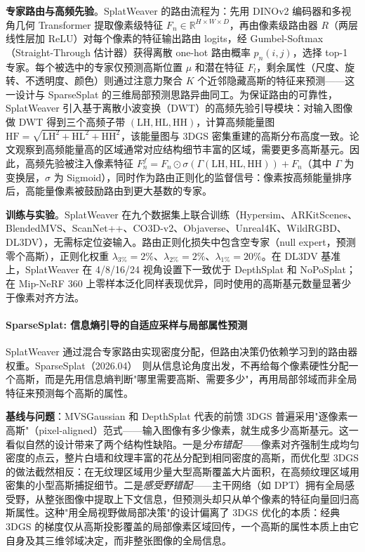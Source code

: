\textbf{专家路由与高频先验}。SplatWeaver 的路由流程为：先用 DINOv2 编码器和多视角几何 Transformer 提取像素级特征 $F_n \in \mathbb{R}^{H \times W \times D}$，再由像素级路由器 $R$（两层线性层加 ReLU）对每个像素的特征输出路由 logits，经 Gumbel-Softmax（Straight-Through 估计器）获得离散 one-hot 路由概率 $p_n(i,j)$，选择 top-1 专家。每个被选中的专家仅预测高斯位置 $\mu$ 和潜在特征 $F_l$，剩余属性（尺度、旋转、不透明度、颜色）则通过注意力聚合 $K$ 个近邻隐藏高斯的特征来预测——这一设计与 SparseSplat 的三维局部预测思路异曲同工。为保证路由的可靠性，SplatWeaver 引入基于离散小波变换（DWT）的高频先验引导模块：对输入图像做 DWT 得到三个高频子带 $(\text{LH}, \text{HL}, \text{HH})$，计算高频能量图 $\text{HF} = \sqrt{\text{LH}^2 + \text{HL}^2 + \text{HH}^2}$，该能量图与 3DGS 密集重建的高斯分布高度一致。论文观察到高频能量高的区域通常对应结构细节丰富的区域，需要更多高斯基元。因此，高频先验被注入像素特征 $F_n^f = F_n \odot \sigma(\Gamma(\text{LH}, \text{HL}, \text{HH})) + F_n$（其中 $\Gamma$ 为变换层，$\sigma$ 为 Sigmoid），同时作为路由正则化的监督信号：像素按高频能量排序后，高能量像素被鼓励路由到更大基数的专家。

\textbf{训练与实验}。SplatWeaver 在九个数据集上联合训练（Hypersim、ARKitScenes、BlendedMVS、ScanNet++、CO3D-v2、Objaverse、Unreal4K、WildRGBD、DL3DV），无需标定位姿输入。路由正则化损失中包含空专家（null expert，预测零个高斯），正则化权重 $\lambda_{3\%} = 2\%$、$\lambda_{2\%} = 2\%$、$\lambda_{1\%} = 20\%$。在 DL3DV 基准上，SplatWeaver 在 4/8/16/24 视角设置下一致优于 DepthSplat 和 NoPoSplat；在 Mip-NeRF 360 上零样本泛化同样表现优异，同时使用的高斯基元数量显著少于像素对齐方法。

\paragraph{SparseSplat: 信息熵引导的自适应采样与局部属性预测}

SplatWeaver 通过混合专家路由实现密度分配，但路由决策仍依赖学习到的路由器权重。SparseSplat（2026.04）~\cite{2604_03069}则从信息论角度出发，不再给每个像素硬性分配一个高斯，而是先用信息熵判断"哪里需要高斯、需要多少"，再用局部邻域而非全局特征来预测每个高斯的属性。

\textbf{基线与问题}：MVSGaussian 和 DepthSplat 代表的前馈 3DGS 普遍采用"逐像素一高斯"（pixel-aligned）范式——输入图像有多少像素，就生成多少高斯基元。这一看似自然的设计带来了两个结构性缺陷。一是\emph{分布错配}——像素对齐强制生成均匀密度的点云，整片白墙和纹理丰富的花丛分配到相同密度的高斯，而优化型 3DGS 的做法截然相反：在无纹理区域用少量大型高斯覆盖大片面积，在高频纹理区域用密集的小型高斯捕捉细节。二是\emph{感受野错配}——主干网络（如 DPT）拥有全局感受野，从整张图像中提取上下文信息，但预测头却只从单个像素的特征向量回归高斯属性。这种"用全局视野做局部决策"的设计偏离了 3DGS 优化的本质：经典 3DGS 的梯度仅从高斯投影覆盖的局部像素区域回传，一个高斯的属性本质上由它自身及其三维邻域决定，而非整张图像的全局信息。

